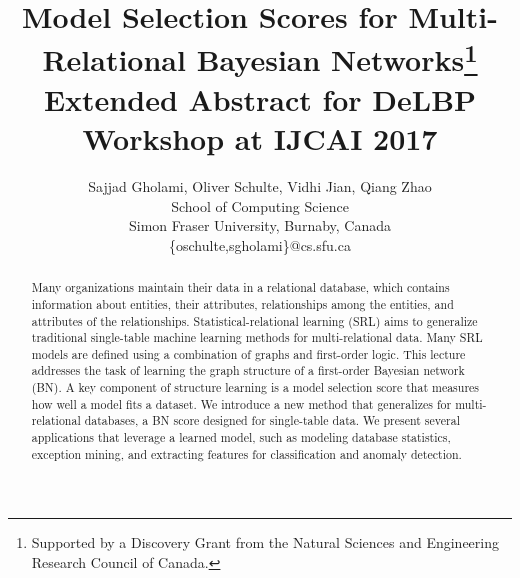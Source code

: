 \documentclass{article}
\title{Model Selection Scores for Multi-Relational Bayesian Networks\thanks{Supported by a Discovery Grant from the Natural Sciences and Engineering Research Council of Canada.}\\
Extended Abstract for DeLBP Workshop at IJCAI 2017}
\author{Sajjad Gholami, Oliver Schulte, Vidhi Jian, Qiang Zhao\\ 
School of Computing Science\\
Simon Fraser University, Burnaby, Canada\\
\{oschulte,sgholami\}@cs.sfu.ca}
\begin{document}
\maketitle  
\begin{abstract} Many organizations maintain their data in a relational database, which contains information about entities, their attributes, relationships among the entities, and attributes of the relationships. Statistical-relational learning (SRL)
aims to generalize traditional single-table machine learning methods for multi-relational data. Many SRL models are defined using a combination of graphs and first-order logic.  This lecture addresses the task of learning the graph structure of a first-order Bayesian network (BN). A key component of structure learning is a model selection score that measures how well a model fits a dataset. We introduce a new method that generalizes for multi-relational databases, a BN score designed for single-table data.
We present several applications that leverage a learned model, such as modeling database statistics, exception mining, and extracting features for classification and anomaly detection. 
\end{abstract}
\end{document}
